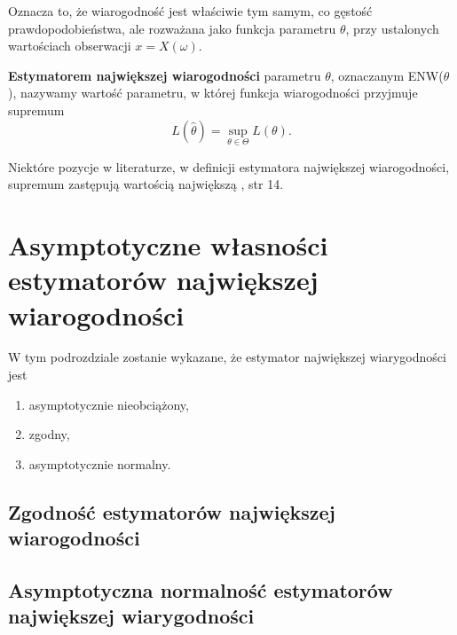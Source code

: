Oznacza to, że wiarogodność jest właściwie tym samym, co gęstość prawdopodobieństwa,
ale rozważana jako funkcja parametru $\theta$, przy ustalonych wartościach obserwacji
$x = X(\omega)$.


\begin{definition}
\textbf{Estymatorem największej wiarogodności} parametru $\theta$, oznaczanym ENW($\theta$), nazywamy wartość parametru, w której funkcja
wiarogodności przyjmuje supremum $$L(\hat{\theta}) = \sup_{\theta \in \Theta} L(\theta).$$

\end{definition}

Niektóre pozycje w literaturze, w definicji estymatora największej wiarogodności, supremum zastępują wartością największą \cite{rydl1}, str 14.

\section{Asymptotyczne własności estymatorów największej wiarogodności}

W tym podrozdziale zostanie wykazane, że estymator największej wiarygodności jest
\begin{enumerate}
\item asymptotycznie nieobciążony,
\item zgodny,
\item asymptotycznie normalny.
\end{enumerate}

\subsection{Zgodność estymatorów największej wiarogodności}
\subsection{Asymptotyczna normalność estymatorów największej wiarygodności}